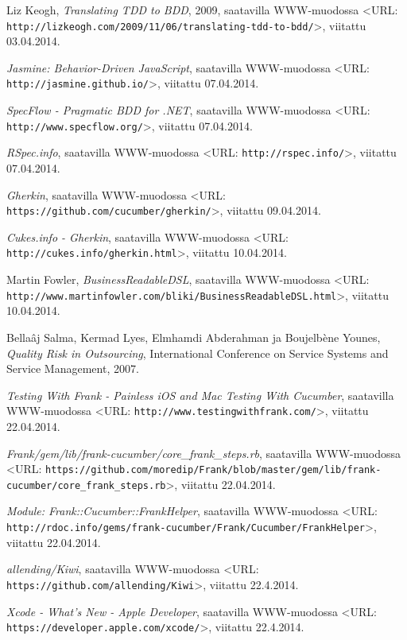 \documentclass[finnish,nonumbib,nocopyright]{gradu2}
\begin{document}
\begin{thebibliography}{9}
Liz Keogh, \textit{Translating TDD to BDD}, 2009, saatavilla WWW-muodossa
<URL: \texttt{http://lizkeogh.com/2009/11/06/translating-tdd-to-bdd/}>, viitattu 03.04.2014.

\textit{Jasmine: Behavior-Driven JavaScript}, saatavilla WWW-muodossa
<URL: \texttt{http://jasmine.github.io/}>, viitattu 07.04.2014.

\textit{SpecFlow - Pragmatic BDD for .NET}, saatavilla WWW-muodossa
<URL: \texttt{http://www.specflow.org/}>, viitattu 07.04.2014.

\textit{RSpec.info}, saatavilla WWW-muodossa
<URL: \texttt{http://rspec.info/}>, viitattu 07.04.2014.

\textit{Gherkin}, saatavilla WWW-muodossa
<URL: \texttt{https://github.com/cucumber/gherkin/}>, viitattu 09.04.2014.

\textit{Cukes.info - Gherkin}, saatavilla WWW-muodossa
<URL: \texttt{http://cukes.info/gherkin.html}>, viitattu 10.04.2014. 

Martin Fowler, \textit{BusinessReadableDSL}, saatavilla WWW-muodossa
<URL: \texttt{http://www.martinfowler.com/bliki/BusinessReadableDSL.html}>, viitattu 10.04.2014.

Bellaâj Salma, Kermad Lyes, Elmhamdi Abderahman ja Boujelbène Younes, \textit{Quality Risk in Outsourcing},
International Conference on Service Systems and Service Management, 2007.

\textit{Testing With Frank - Painless iOS and Mac Testing With Cucumber}, saatavilla WWW-muodossa
<URL: \texttt{http://www.testingwithfrank.com/}>, viitattu 22.04.2014.

\textit{Frank/gem/lib/frank-cucumber/core\_frank\_steps.rb}, saatavilla WWW-muodossa
<URL: \texttt{https://github.com/moredip/Frank/blob/master/gem/lib/frank-cucumber/core\_frank\_steps.rb}>, viitattu 22.04.2014.

\textit{Module: Frank::Cucumber::FrankHelper}, saatavilla WWW-muodossa
<URL: \texttt{http://rdoc.info/gems/frank-cucumber/Frank/Cucumber/FrankHelper}>, viitattu 22.04.2014.

\textit{allending/Kiwi}, saatavilla WWW-muodossa
<URL: \texttt{https://github.com/allending/Kiwi}>, viitattu 22.4.2014.

\textit{Xcode - What's New - Apple Developer}, saatavilla WWW-muodossa
<URL: \texttt{https://developer.apple.com/xcode/}>, viitattu 22.4.2014.


\end{thebibliography}
\end{document}
